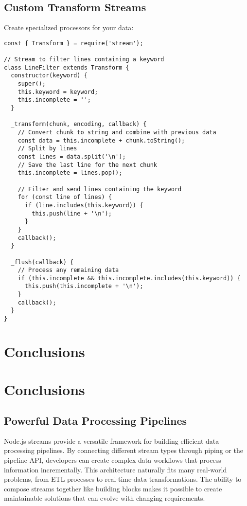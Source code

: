 \documentclass[12pt,letterpaper]{article}
\newenvironment{macterminal}{%
    \begin{mdframed}[
        linecolor=terminalFrame,
        backgroundcolor=terminalBg,
        roundcorner=5pt,
        skipabove=5pt,
        skipbelow=5pt,
        linewidth=1pt,
        innertopmargin=5pt,
        frametitle={%
            \tikz[baseline=(current bounding box.east), outer sep=0pt]{
                \fill[red!80!black] (0,0) circle (5pt);
                \fill[yellow!80!black] (0.7,0) circle (5pt);
                \fill[green!70!black] (1.4,0) circle (5pt);
            }
        },
        frametitlealignment=\raggedright,
        frametitleaboveskip=8pt,
        frametitlebelowskip=0pt,
    ]
}{%
    \end{mdframed}%
}
\begin{document}
\subsection{Custom Transform Streams}

Create specialized processors for your data:

\begin{macterminal}
\begin{lstlisting}
const { Transform } = require('stream');

// Stream to filter lines containing a keyword
class LineFilter extends Transform {
  constructor(keyword) {
    super();
    this.keyword = keyword;
    this.incomplete = '';
  }
  
  _transform(chunk, encoding, callback) {
    // Convert chunk to string and combine with previous data
    const data = this.incomplete + chunk.toString();
    // Split by lines
    const lines = data.split('\n');
    // Save the last line for the next chunk
    this.incomplete = lines.pop();
    
    // Filter and send lines containing the keyword
    for (const line of lines) {
      if (line.includes(this.keyword)) {
        this.push(line + '\n');
      }
    }
    callback();
  }
  
  _flush(callback) {
    // Process any remaining data
    if (this.incomplete && this.incomplete.includes(this.keyword)) {
      this.push(this.incomplete + '\n');
    }
    callback();
  }
}
\end{lstlisting}
\end{macterminal}

\section{Conclusions}

\section{Conclusions}


\subsection{Powerful Data Processing Pipelines}

Node.js streams provide a versatile framework for building efficient data processing pipelines. By connecting different stream types through piping or the pipeline API, developers can create complex data workflows that process information incrementally. This architecture naturally fits many real-world problems, from ETL processes to real-time data transformations. The ability to compose streams together like building blocks makes it possible to create maintainable solutions that can evolve with changing requirements.
\end{document}
